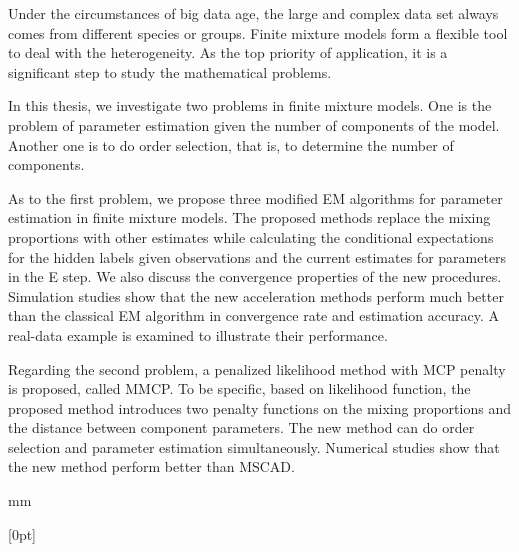 \documentclass[a4paper,12pt,openany,oneside,utf-8]{ctexbook}
\begin{document}
Under the circumstances of big data age, the large and complex data set always comes from different species or groups. Finite mixture models form a flexible tool to deal with the heterogeneity. As the top priority of application, it is a significant step to study the mathematical problems.

In this thesis, we investigate two problems in finite mixture models. One is the problem of parameter estimation given the number of components of the model. Another one is to do order selection, that is, to determine the number of components.

As to the first problem, we propose three modified EM algorithms for parameter estimation in finite mixture models. The proposed methods replace the mixing proportions with other estimates while calculating the conditional expectations for the hidden labels given observations and the current estimates for parameters in the E step. We also discuss the convergence properties of the new procedures. Simulation studies show that the new acceleration methods perform much better than the classical EM algorithm in convergence rate and estimation accuracy. A real-data example is examined to illustrate their performance.

Regarding the second problem, a penalized likelihood method with MCP penalty is proposed, called MMCP. To be specific, based on likelihood function, the proposed method introduces two penalty functions on the mixing proportions and the distance between component parameters. The new method can do order selection and parameter estimation simultaneously. Numerical studies show that the new method perform better than MSCAD.

 mm


\newpage
\begin{spacing}{1.8}
\tableofcontents
{}[0pt]{\addvspace{2pt}\filright}
{\contentspush{\thecontentslabel\ }}
{}{\contentspage}
\end{spacing}
\end{document}
